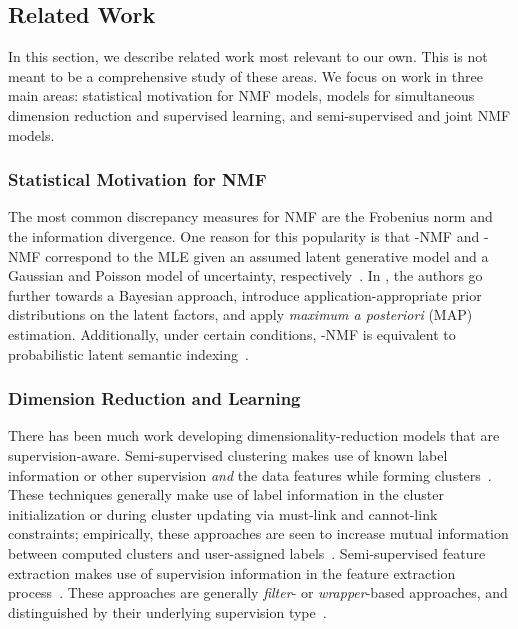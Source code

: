 \documentclass[twocolumn,10pt]{article}
\begin{document}
\subsection{Related Work}\label{sec:related work}
In this section, we describe related work most relevant to our own.  This is not meant to be a comprehensive study of these areas.  We focus on work in three main areas: statistical motivation for NMF models, models for simultaneous dimension reduction and supervised learning, and semi-supervised and joint NMF models.

\subsubsection*{Statistical Motivation for NMF} 
The most common discrepancy measures for NMF are the Frobenius norm and the information divergence.  One reason for this popularity is that -NMF and -NMF correspond to the MLE given an assumed latent generative model and a Gaussian and Poisson model of uncertainty, respectively~\cite{cemgil2008bayesian,favaro20073,virtanen2008bayesian}. In \cite{cemgil2008bayesian,virtanen2008bayesian}, the authors go further towards a Bayesian approach, introduce application-appropriate prior distributions on the latent factors, and apply \emph{maximum a posteriori} (MAP) estimation. 
Additionally, 
under certain conditions, -NMF is equivalent to probabilistic latent semantic indexing~\cite{ding2008equivalence}.

\subsubsection*{Dimension Reduction and Learning} 
There has been much work developing dimensionality-reduction models that are supervision-aware. 
Semi-supervised clustering makes use of known label information or other supervision \emph{and} the data features while forming clusters~\cite{basu2002semi,klein2002instance,wagstaff2001constrained}. These techniques generally make use of label information in the cluster initialization or during cluster updating via must-link and cannot-link constraints; empirically, these approaches are seen to increase mutual information between computed clusters and user-assigned labels~\cite{basu2002semi}.
Semi-supervised feature extraction makes use of supervision information in the feature extraction process~\cite{fukumizu2004dimensionality, sheikhpour2017survey}.  These approaches are generally \emph{filter}- or \emph{wrapper}-based approaches, and distinguished by their underlying supervision type~\cite{sheikhpour2017survey}.
\end{document}
